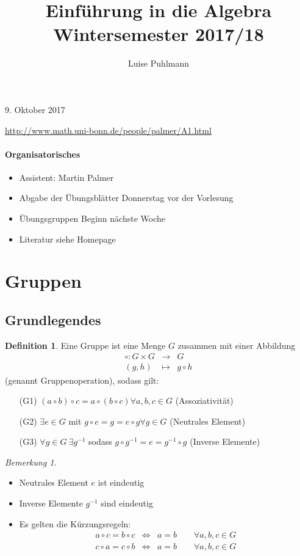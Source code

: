 \documentclass[12pt,a4paper]{article}
\author{Luise Puhlmann}
\title{Einführung in die Algebra\\ Wintersemester 2017/18}
\newcounter{defcounter}[subsection]
\theoremstyle{definition}
\newtheorem{defi}[defcounter]{Definition}
\theoremstyle{remark}
\newtheorem*{bem}{Bemerkung}
\theoremstyle{definition}
\theoremstyle{definition}
\theoremstyle{plain}
\theoremstyle{plain}
\begin{document}
\maketitle
\tableofcontents
\newpage

\hfill 9. Oktober 2017

\vspace{1cm}

\url{http://www.math.uni-bonn.de/people/palmer/A1.html}

\paragraph {Organisatorisches}
\begin{itemize}
	\item Assistent: Martin Palmer
	\item Abgabe der Übungsblätter Donnerstag vor der Vorlesung
	\item Übungsgruppen Beginn nächste Woche
	\item Literatur siehe Homepage
\end{itemize}

\section{Gruppen}
\subsection{Grundlegendes}
\begin{defi} Eine Gruppe ist eine Menge $G$ zusammen mit einer Abbildung
\begin{eqnarray*}
	\circ\colon G\times G &\to& G\\
	 (g,h)&\mapsto& g\circ h
\end{eqnarray*}
(genannt Gruppenoperation), sodass gilt:
\begin{itemize}
	\item[(G1)]$(a\circ b)\circ c = a \circ (b\circ c) \forall a,b,c\in G$ (Assoziativität)
	\item[(G2)] $\exists e\in G$ mit $g\circ e = g = e\circ g\forall g\in G$ (Neutrales Element)
	\item[(G3)] $\forall g\in G\ \exists g^{-1}$ sodass $g\circ g^{-1} = e = g^{-1}\circ g$ (Inverse Elemente)
\end{itemize}
\end{defi}

\begin{bem}
\leavevmode
\begin{itemize}
	\item Neutrales Element $e$ ist eindeutig
	\item Inverse Elemente $g^{-1}$ sind eindeutig
	\item Es gelten die Kürzungsregeln:
		\begin{eqnarray*}
			a\circ c = b\circ c &\Leftrightarrow& a = b\qquad \forall a,b,c\in G\\
			c\circ a = c\circ b &\Leftrightarrow& a = b \qquad \forall a,b,c\in G
		\end{eqnarray*}
\end{itemize}
\end{bem}
\end{document}
